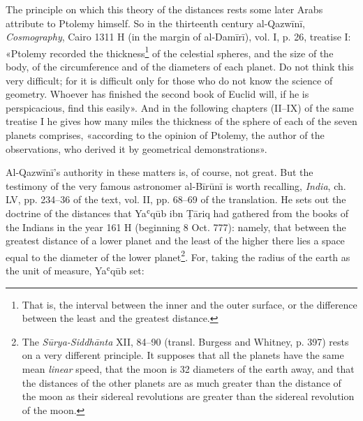 \documentclass[11pt]{article}
\begin{document}
\par The principle on which this theory of the distances rests some later Arabs attribute to Ptolemy himself. So in the thirteenth century al-Qazwīnī, \emph{Cosmography}, Cairo 1311 H (in the margin of al-Damīrī), vol. I, p. 26, treatise I: «Ptolemy recorded the thickness\footnote{That is, the interval between the inner and the outer surface, or the difference between the least and the greatest distance.} of the celestial spheres, and the size of the body, of the circumference and of the diameters of each planet. Do not think this very difficult; for it is difficult only for those who do not know the science of geometry. Whoever has finished the second book of Euclid will, if he is perspicacious, find this easily». And in the following chapters (II–IX) of the same treatise I he gives how many miles the thickness of the sphere of each of the seven planets comprises, «according to the opinion of Ptolemy, the author of the observations, who derived it by geometrical demonstrations».\par
\par Al-Qazwīnī's authority in these matters is, of course, not great. But the testimony of the very famous astronomer al-Bīrūnī is worth recalling, \emph{India}, ch. LV, pp. 234–36 of the text, vol. II, pp. 68–69 of the translation. He sets out the doctrine of the distances that Yaʿqūb ibn Ṭāriq had gathered from the books of the Indians in the year 161 H (beginning 8 Oct. 777): namely, that between the greatest distance of a lower planet and the least of the higher there lies a space equal to the diameter of the lower planet\footnote{The \emph{Sūrya-Siddhānta} XII, 84–90 (transl. Burgess and Whitney, p. 397) rests on a very different principle. It supposes that all the planets have the same mean \emph{linear} speed, that the moon is 32 diameters of the earth away, and that the distances of the other planets are as much greater than the distance of the moon as their sidereal revolutions are greater than the sidereal revolution of the moon.}. For, taking the radius of the earth as the unit of measure, Yaʿqūb set:\par
\end{document}
